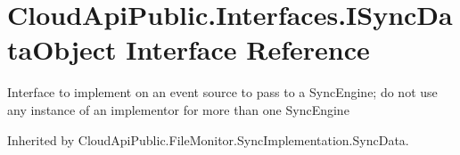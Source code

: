 \hypertarget{interface_cloud_api_public_1_1_interfaces_1_1_i_sync_data_object}{\section{Cloud\-Api\-Public.\-Interfaces.\-I\-Sync\-Data\-Object Interface Reference}
\label{interface_cloud_api_public_1_1_interfaces_1_1_i_sync_data_object}
}


Interface to implement on an event source to pass to a Sync\-Engine; do not use any instance of an implementor for more than one Sync\-Engine  




Inherited by Cloud\-Api\-Public.\-File\-Monitor.\-Sync\-Implementation.\-Sync\-Data.

